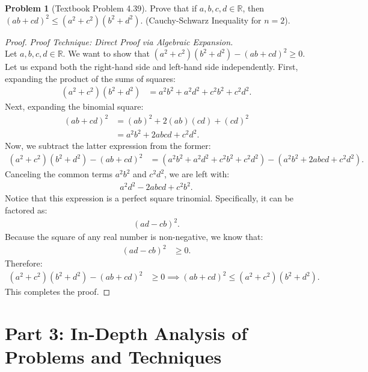 \documentclass[11pt]{article}
\theoremstyle{definition}
\newtheorem{problem}{Problem}
\theoremstyle{remark}
\begin{document}
\begin{itemize}
\begin{problem}[Textbook Problem 4.39]
Prove that if $a, b, c, d \in \mathbb{R}$, then $(ab + cd)^2 \le (a^2 + c^2)(b^2 + d^2)$. (Cauchy-Schwarz Inequality for $n=2$).
\end{problem}
\begin{proof}
\textit{Proof Technique: Direct Proof via Algebraic Expansion.} \\
Let $a, b, c, d \in \mathbb{R}$. We want to show that $(a^2 + c^2)(b^2 + d^2) - (ab + cd)^2 \ge 0$. 
Let us expand both the right-hand side and left-hand side independently. 
First, expanding the product of the sums of squares:
\begin{align*}
    (a^2 + c^2)(b^2 + d^2) &= a^2b^2 + a^2d^2 + c^2b^2 + c^2d^2.
\end{align*}
Next, expanding the binomial square:
\begin{align*}
    (ab + cd)^2 &= (ab)^2 + 2(ab)(cd) + (cd)^2 \\
    &= a^2b^2 + 2abcd + c^2d^2.
\end{align*}
Now, we subtract the latter expression from the former:
\begin{align*}
    (a^2 + c^2)(b^2 + d^2) - (ab + cd)^2 &= (a^2b^2 + a^2d^2 + c^2b^2 + c^2d^2) - (a^2b^2 + 2abcd + c^2d^2).
\end{align*}
Canceling the common terms $a^2b^2$ and $c^2d^2$, we are left with:
\begin{align*}
    a^2d^2 - 2abcd + c^2b^2.
\end{align*}
Notice that this expression is a perfect square trinomial. Specifically, it can be factored as:
\begin{align*}
    (ad - cb)^2.
\end{align*}
Because the square of any real number is non-negative, we know that:
\begin{align*}
    (ad - cb)^2 &\ge 0.
\end{align*}
Therefore:
\begin{align*}
    (a^2 + c^2)(b^2 + d^2) - (ab + cd)^2 &\ge 0 \implies (ab + cd)^2 \le (a^2 + c^2)(b^2 + d^2).
\end{align*}
This completes the proof.
\end{proof}

\newpage
\section{Part 3: In-Depth Analysis of Problems and Techniques}


\end{itemize}
\end{document}
